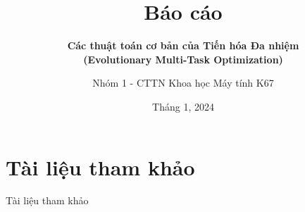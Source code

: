 \documentclass[aspectratio=169]{beamer}
\title{Báo cáo}
\subtitle{\textbf{Các thuật toán cơ bản của Tiến hóa Đa nhiệm
    \\(Evolutionary Multi-Task Optimization)}}
\author{Nhóm 1 - CTTN Khoa học Máy tính K67}
\date{Tháng 1, 2024}
\begin{document}
\begin{frame}[noframenumbering]
	\titlepage
\end{frame}








\section{Tài liệu tham khảo}
\begin{frame}[allowframebreaks]{Tài liệu tham khảo}
    \nocite{*}
    
    
\end{frame}

\begin{frame}{~}
\end{frame}
\end{document}

